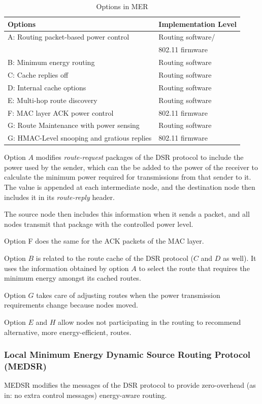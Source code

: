 \begin{table}[b]
  \begin{tabular}{ll}
    Options & Implementation Level  \\
    \hline
    A: Routing packet-based power control & Routing software/\\ &802.11 firmware \\
    B: Minimum energy routing & Routing software \\
    C: Cache replies off & Routing software \\
    D: Internal cache options & Routing software \\
    E: Multi-hop route discovery & Routing software \\
    F: MAC layer ACK power control & 802.11 firmware \\
    G: Route Maintenance with power sensing & Routing software \\
    G: HMAC-Level snooping and gratious replies & 802.11 firmware \\
  \end{tabular}
  \caption{Options in MER}
  \label{tbl:mer-options}
\end{table}

Option $A$ modifies \textit{route-request} packages of the DSR protocol to
include the power used by the sender, which can the be added to the power
of the receiver to calculate the minimum power required for transmissions
from that sender to it. The value is appended at each intermediate node, and the
destination node then includes it in its \textit{route-reply} header.

The source node then includes this information when it sends a packet, and
all nodes transmit that package with the controlled power level.

Option F does the same for the ACK packets of the MAC layer.

Option $B$ is related to the route cache of the DSR protocol ($C$ and $D$ as well). It
uses the information obtained by option $A$ to select the route that requires
the minimum energy amongst its cached routes.

Option $G$ takes care of adjusting routes when the power transmission requirements
change because nodes moved.

Option $E$ and $H$ allow nodes not participating in the routing to recommend
alternative, more energy-efficient, routes.
\subsubsection{Local Minimum Energy Dynamic Source Routing Protocol (MEDSR)}
MEDSR\cite{tanque2007minimum} modifies the messages of the DSR protocol to
provide zero-overhead (as in: no extra control messages) energy-aware routing.

